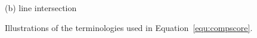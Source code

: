 \begin{figure}[!t]
{\begin{minipage}[t]{0.11\textwidth}
            \centering \footnotesize (b) line intersection
        \end{minipage}
    }
    \hspace{0.1cm}
    \caption{Illustrations of the terminologies used in Equation~\ref{equ:compscore}.}
    \label{fig:intersection-overlap}
\end{figure}
